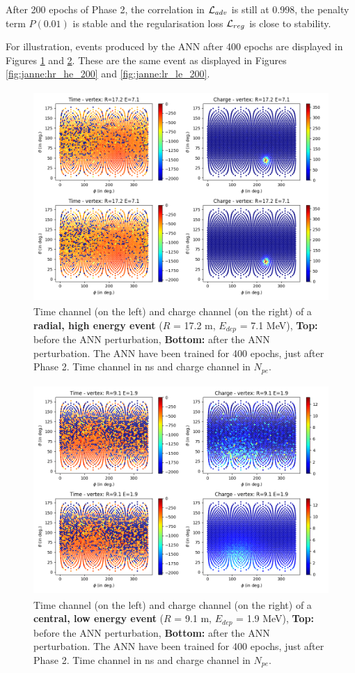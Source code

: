 \documentclass[../main.tex]{subfiles}
\begin{document}
After 200 epochs of Phase 2, the correlation in ${\cal L}_{adv}$ is still at 0.998, the penalty term $P(0.01)$ is stable and the regularisation loss ${\cal L}_{reg}$ is close to stability.

For illustration, events produced by the ANN after 400 epochs are displayed in Figures \ref{fig:janne:hr_he_400} and \ref{fig:janne:lr_le_400}. These are the same event as displayed in Figures \ref{fig:janne:hr_he_200} and \ref{fig:janne:lr_le_200}.

\begin{figure}[!ht]
  \centering
  \includegraphics[height=8cm]{images/janne/events/hr_he_400.png}
  \caption{Time channel (on the left) and charge channel (on the right) of a \textbf{radial, high energy event} ($R$ = 17.2 m, $E_{dep}$ = 7.1 MeV), \textbf{Top:} before the ANN perturbation, \textbf{Bottom:} after the ANN perturbation. The ANN have been trained for 400 epochs, just after Phase 2. Time channel in ns and charge channel in $N_{pe}$.}
  \label{fig:janne:hr_he_400}
\end{figure}

\begin{figure}[!ht]
  \centering
  \includegraphics[height=8cm]{images/janne/events/lr_le_400.png}
  \caption{Time channel (on the left) and charge channel (on the right) of a \textbf{central, low energy event} ($R$ = 9.1 m, $E_{dep}$ = 1.9 MeV), \textbf{Top:} before the ANN perturbation, \textbf{Bottom:} after the ANN perturbation. The ANN have been trained for 400 epochs, just after Phase 2. Time channel in ns and charge channel in $N_{pe}$.}
  \label{fig:janne:lr_le_400}
\end{figure}
\end{document}
